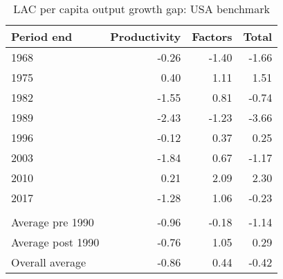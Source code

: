 \begin{table}[!h]

\caption{\label{tab:}LAC per capita output growth gap: USA benchmark}
\centering
\begin{tabular}[t]{lrrr}
\toprule
Period end & Productivity & Factors & Total\\
\midrule
1968 & -0.26 & -1.40 & -1.66\\
1975 & 0.40 & 1.11 & 1.51\\
1982 & -1.55 & 0.81 & -0.74\\
1989 & -2.43 & -1.23 & -3.66\\
1996 & -0.12 & 0.37 & 0.25\\
2003 & -1.84 & 0.67 & -1.17\\
2010 & 0.21 & 2.09 & 2.30\\
2017 & -1.28 & 1.06 & -0.23\\
\addlinespace[0.3em]
\multicolumn{4}{l}{\textbf{Averages}}\\
\hspace{1em}Average pre 1990 & -0.96 & -0.18 & -1.14\\
\hspace{1em}Average post 1990 & -0.76 & 1.05 & 0.29\\
\hspace{1em}Overall average & -0.86 & 0.44 & -0.42\\
\bottomrule
\end{tabular}
\end{table}